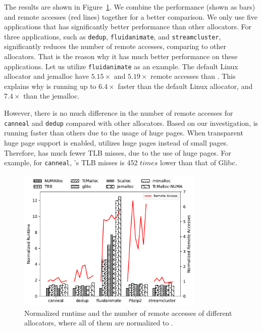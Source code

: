 The results are shown in Figure~\ref{fig:remoteAccess}. We combine the performance (shown as bars) and remote accesses (red lines) together for a better comparison. We only use five applications that \NM{} has significantly better performance than other allocators.  For three applications, such as \texttt{dedup}, \texttt{fluidanimate}, and \texttt{streamcluster}, \NM{}  significantly reduces the number of remote accesses, comparing to other allocators. That is the reason why it has much better performance on these applications. Let us utilize \texttt{fluidanimate} as an example. The default Linux allocator and jemalloc 
have $5.15\times$ and $5.19\times$ remote accesses than \NM{}. This explains why \NM{} is running up to $6.4\times$ faster than the default Linux allocator, and $7.4\times$ than the jemalloc. 

However, there is no much difference in the number of remote accesses for \texttt{canneal} and \texttt{dedup} compared with other allocators. Based on our investigation, \NM{} is running faster than others due to the usage of huge pages. When transparent huge page support is enabled, \NM{} utilizes huge pages instead of small pages. Therefore, \NM{} has much fewer TLB misses, due to the use of huge pages. For example, for \texttt{canneal}, \NM{}'s TLB misses is 452 $times$ lower than that of Glibc.




\begin{figure}[!h]
    \centering
    \includegraphics[width=3.5in]{figure/remote-access.pdf}
    \caption{Normalized runtime and the number of remote accesses of different allocators, where all of them are normalized to \NM{}. }
    \label{fig:remoteAccess}
\end{figure}

